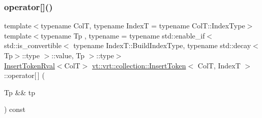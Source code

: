 \mbox{\label{structvt_1_1vrt_1_1collection_1_1_insert_token_acf463a3c311249bcfad332e6a87c757a}} 
\subsubsection{\texorpdfstring{operator[]()}{operator[]()}\hspace{0.1cm}{\footnotesize\ttfamily [1/2]}}
{\footnotesize\ttfamily template$<$typename ColT, typename IndexT = typename Col\+T\+::\+Index\+Type$>$ \\
template$<$typename Tp , typename  = typename std\+::enable\+\_\+if$<$      std\+::is\+\_\+convertible$<$        typename Index\+T\+::\+Build\+Index\+Type, typename std\+::decay$<$\+Tp$>$\+::type      $>$\+::value, Tp    $>$\+::type$>$ \\
\hyperlink{structvt_1_1vrt_1_1collection_1_1_insert_token_rval}{Insert\+Token\+Rval}$<$ColT$>$ \hyperlink{structvt_1_1vrt_1_1collection_1_1_insert_token}{vt\+::vrt\+::collection\+::\+Insert\+Token}$<$ ColT, IndexT $>$\+::operator\mbox{[}$\,$\mbox{]} (\begin{DoxyParamCaption}\item[{Tp \&\&}]{tp }\end{DoxyParamCaption}) const\hspace{0.3cm}{\ttfamily [inline]}}

\mbox{\label{structvt_1_1vrt_1_1collection_1_1_insert_token_ad0f93ec8c0d9cbf770c07c3129153b92}} 
